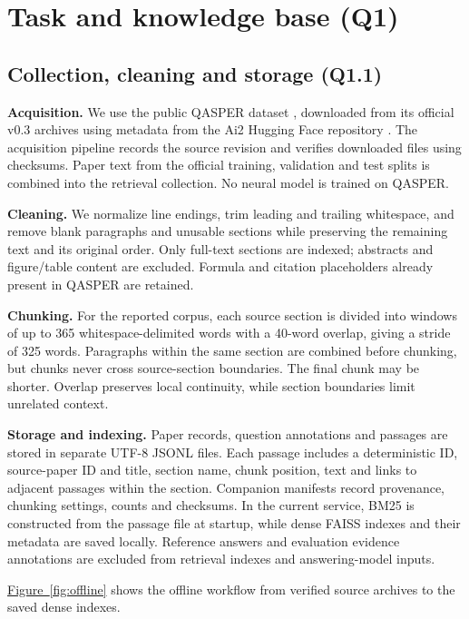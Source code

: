 \section{Task and knowledge base (Q1)}
\subsection{Collection, cleaning and storage (Q1.1)}
\textbf{Acquisition.} We use the public QASPER dataset \citep{dasigi2021qasper}, downloaded from its official v0.3 archives using metadata from the Ai2 Hugging Face repository \citep{qasperdata}. The acquisition pipeline records the source revision and verifies downloaded files using checksums. Paper text from the official training, validation and test splits is combined into the retrieval collection. No neural model is trained on QASPER.

\textbf{Cleaning.} We normalize line endings, trim leading and trailing whitespace, and remove blank paragraphs and unusable sections while preserving the remaining text and its original order. Only full-text sections are indexed; abstracts and figure/table content are excluded. Formula and citation placeholders already present in QASPER are retained.

\textbf{Chunking.} For the reported corpus, each source section is divided into windows of up to 365 whitespace-delimited words with a 40-word overlap, giving a stride of 325 words. Paragraphs within the same section are combined before chunking, but chunks never cross source-section boundaries. The final chunk may be shorter. Overlap preserves local continuity, while section boundaries limit unrelated context.

\textbf{Storage and indexing.} Paper records, question annotations and passages are stored in separate UTF-8 JSONL files. Each passage includes a deterministic ID, source-paper ID and title, section name, chunk position, text and links to adjacent passages within the section. Companion manifests record provenance, chunking settings, counts and checksums. In the current service, BM25 is constructed from the passage file at startup, while dense FAISS indexes and their metadata are saved locally. Reference answers and evaluation evidence annotations are excluded from retrieval indexes and answering-model inputs.

\hyperref[fig:offline]{Figure~\ref*{fig:offline}} shows the offline workflow from verified source archives to the saved dense indexes.


